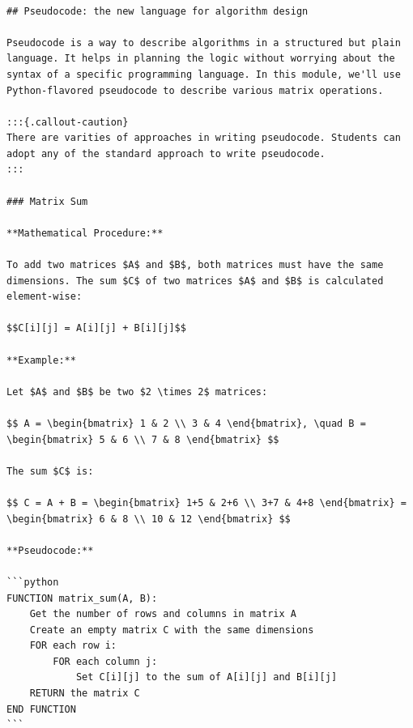 \documentclass[
  letterpaper,
  DIV=11,
  numbers=noendperiod]{scrreprt}
\theoremstyle{plain}
\theoremstyle{definition}
\theoremstyle{remark}
\begin{document}
\begin{verbatim}











## Pseudocode: the new language for algorithm design

Pseudocode is a way to describe algorithms in a structured but plain language. It helps in planning the logic without worrying about the syntax of a specific programming language. In this module, we'll use Python-flavored pseudocode to describe various matrix operations.

:::{.callout-caution}
There are varities of approaches in writing pseudocode. Students can adopt any of the standard approach to write pseudocode.
:::

### Matrix Sum

**Mathematical Procedure:**

To add two matrices $A$ and $B$, both matrices must have the same dimensions. The sum $C$ of two matrices $A$ and $B$ is calculated element-wise:

$$C[i][j] = A[i][j] + B[i][j]$$

**Example:**

Let $A$ and $B$ be two $2 \times 2$ matrices:

$$ A = \begin{bmatrix} 1 & 2 \\ 3 & 4 \end{bmatrix}, \quad B = \begin{bmatrix} 5 & 6 \\ 7 & 8 \end{bmatrix} $$

The sum $C$ is:

$$ C = A + B = \begin{bmatrix} 1+5 & 2+6 \\ 3+7 & 4+8 \end{bmatrix} = \begin{bmatrix} 6 & 8 \\ 10 & 12 \end{bmatrix} $$

**Pseudocode:**

```python
FUNCTION matrix_sum(A, B):
    Get the number of rows and columns in matrix A
    Create an empty matrix C with the same dimensions
    FOR each row i:
        FOR each column j:
            Set C[i][j] to the sum of A[i][j] and B[i][j]
    RETURN the matrix C
END FUNCTION
```


\end{verbatim}
\end{document}
